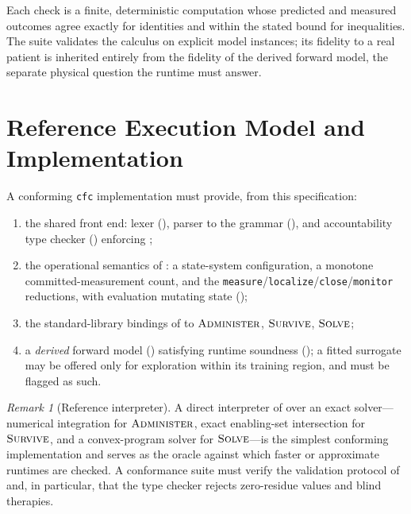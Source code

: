 \documentclass[11pt,a4paper]{article}
\theoremstyle{cfcthm}
\theoremstyle{definition}
\theoremstyle{remark}
\newtheorem{remark}[theorem]{Remark}
\newcommand{\cf}[1]{\texttt{#1}}
\begin{document}
Each check is a finite, deterministic computation whose predicted and measured
outcomes agree exactly for identities and within the stated bound for
inequalities. The suite validates the calculus on explicit model instances; its
fidelity to a real patient is inherited entirely from the fidelity of the
derived forward model, the separate physical question the runtime must answer.

\section{Reference Execution Model and Implementation}
\label{sec:impl}

A conforming \cf{cfc} implementation must provide, from this specification:

\begin{enumerate}[leftmargin=1.6em,itemsep=2pt]
\item the shared front end: lexer (), parser to the grammar
(), and accountability type checker ()
enforcing ;
\item the operational semantics of : a state-system
configuration, a monotone committed-measurement count, and the
\cf{measure}/\cf{localize}/\cf{close}/\cf{monitor} reductions, with evaluation
mutating state ();
\item the standard-library bindings of  to
$\textsc{Administer}$, $\textsc{Survive}$, $\textsc{Solve}$;
\item a \emph{derived} forward model () satisfying
runtime soundness (); a fitted surrogate may be offered only
for exploration within its training region, and must be flagged as such.
\end{enumerate}

\begin{remark}[Reference interpreter]
\label{rem:reference-impl}
A direct interpreter of  over an exact solver---numerical
integration for $\textsc{Administer}$, exact enabling-set intersection for
$\textsc{Survive}$, and a convex-program solver for $\textsc{Solve}$---is the
simplest conforming implementation and serves as the oracle against which
faster or approximate runtimes are checked. A conformance suite must verify the
validation protocol of  and, in particular, that the type
checker rejects zero-residue values and blind therapies.
\end{remark}
\end{document}
